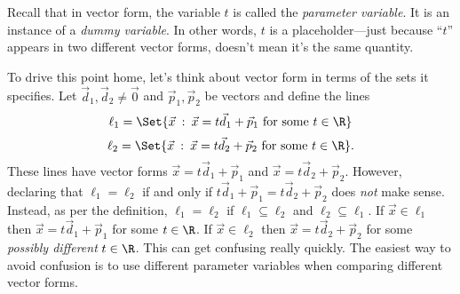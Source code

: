 Recall that in vector form, the variable $t$ is called the \emph{parameter variable}.  It is an instance of
a \emph{dummy variable}. In other words, $t$ is a placeholder---just because ``$t$'' appears in two different vector
forms, doesn't mean it's the same quantity.

To drive this point home, let's think about vector form in terms
of the sets it specifies. Let $\vec d_1,\vec d_2\neq\vec 0$ and $\vec p_1,\vec p_2$ be vectors and define the lines
\[
	\ell_1=\Set{\vec x\given \vec x=t\vec d_1+\vec p_1\text{ for some }t\in\R}
\]
\[
	\ell_2=\Set{\vec x\given \vec x=t\vec d_2+\vec p_2\text{ for some }t\in\R}.
\]
These lines have vector forms $\vec x=t\vec d_1+\vec p_1$ and $\vec x=t\vec d_2+\vec p_2$.
However, declaring that $\ell_1=\ell_2$ if and only if $t\vec d_1+\vec p_1=t\vec d_2+\vec p_2$
does \emph{not} make sense.   Instead, as per the definition, $\ell_1=\ell_2$ if $\ell_1\subseteq\ell_2$ and $\ell_2\subseteq\ell_1$.
If $\vec x\in\ell_1$ then $\vec x=t\vec d_1+\vec p_1$ for some $t\in\R$.  If $\vec x\in\ell_2$
then $\vec x=t\vec d_2+\vec p_2$ for some \emph{possibly different} $t\in \R$.  This can get
confusing really quickly.  The easiest way to avoid confusion is to use different parameter variables 
when comparing different vector forms.

